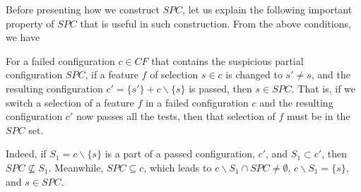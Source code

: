 
Before presenting how we construct $SPC$, let us explain the
following important property of $SPC$ that is useful in such
construction. From the above conditions, we have


%


\begin{Property}
\label{proper_2}
For a failed configuration $c \in CF$ that contains the suspicious
partial configuration $SPC$, if a feature $f$ of selection $s \in c$
is changed to $s' \neq s$, and the resulting configuration $c' =
\{s'\}+c \backslash \{s\}$ is passed, then $s \in SPC$. That is, if we
switch a selection of a feature $f$ in a failed configuration $c$ and
the resulting configuration $c'$ now passes all the tests, then that
selection of $f$ must be in the $SPC$ set.
\end{Property}

 Indeed, if $S_1 = c \backslash \{s\}$ is a part
of a passed configuration, $c'$, and $S_1 \subset c'$, then $SPC \not
\subseteq S_1$. Meanwhile, $SPC \subseteq c$, which leads to $c
\backslash {S_1 }\cap SPC \neq \emptyset$, $c \backslash {S_1}=\{s\}$,
and $s \in SPC$.
%

